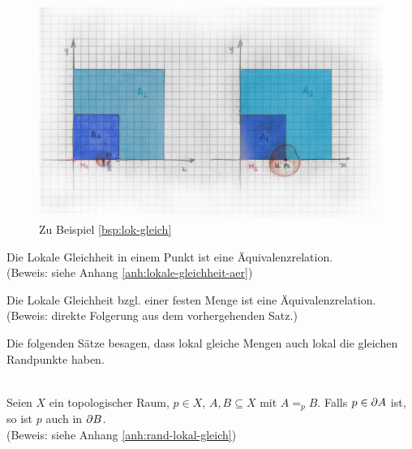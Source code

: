     \begin{figure}[ht]
        \centering
        \includegraphics[width=\textwidth]{bearbeitet-22-04-25/lok-gleich.png}
        \caption{Zu Beispiel \ref{bsp:lok-gleich}}
        \label{fig:lok-gleich}
    \end{figure}

        
%     
    
    \begin{satz}\label{satz:lokale-gleichheit-aer}
        Die Lokale Gleichheit in einem Punkt ist eine Äquivalenzrelation.\\
        (Beweis: siehe Anhang \ref{anh:lokale-gleichheit-aer})
    \end{satz}
    
    \begin{kor}\label{kor:lokale-gleichheit-aer}
     Die Lokale Gleichheit bzgl. einer festen Menge ist eine Äquivalenzrelation.\\
     (Beweis: direkte Folgerung aus dem vorhergehenden Satz.)
    \end{kor}
    
    Die folgenden Sätze besagen, dass lokal gleiche Mengen auch lokal die gleichen Randpunkte haben.
    \begin{satz}\label{satz:rand-lokal-gleich}\ \\
        Seien $X$ ein topologischer Raum, $p \in X$, $A,B \subseteq X$ mit $A =_p B$. Falls $p \in \partial A$ ist, so ist $p$ auch in $\partial B$.\\
        (Beweis: siehe Anhang \ref{anh:rand-lokal-gleich})
    \end{satz}
    
